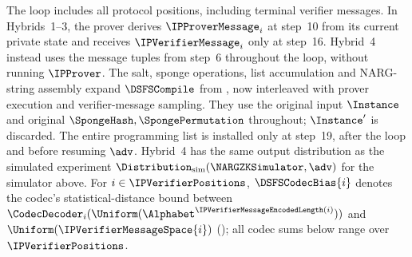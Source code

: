 \begin{definition}
The loop includes all protocol positions, including terminal verifier messages. In Hybrids~1--3, the prover derives \(\IPProverMessage_i\) at step~10 from its current private state and receives \(\IPVerifierMessage_i\) only at step~16. Hybrid~4 instead uses the message tuples from step~6 throughout the loop, without running \(\IPProver\). The salt, sponge operations, list accumulation and NARG-string assembly expand \(\DSFSCompile\) from , now interleaved with prover execution and verifier-message sampling. They use the original input \(\Instance\) and original \(\SpongeHash,\SpongePermutation\) throughout; \(\Instance'\) is discarded. The entire programming list is installed only at step~19, after the loop and before resuming \(\adv\). Hybrid~4 has the same output distribution as the simulated experiment \(\Distribution_{\mathrm{sim}}(\NARGZKSimulator,\adv)\) for the simulator above. For \(i\in \IPVerifierPositions\), \(\DSFSCodecBias{i}\) denotes the codec's statistical-distance bound between \(\CodecDecoder_i(\Uniform(\Alphabet^{\IPVerifierMessageEncodedLength(i)}))\) and \(\Uniform(\IPVerifierMessageSpace{i})\) (); all codec sums below range over \(\IPVerifierPositions\).
\leanok
\end{definition}

